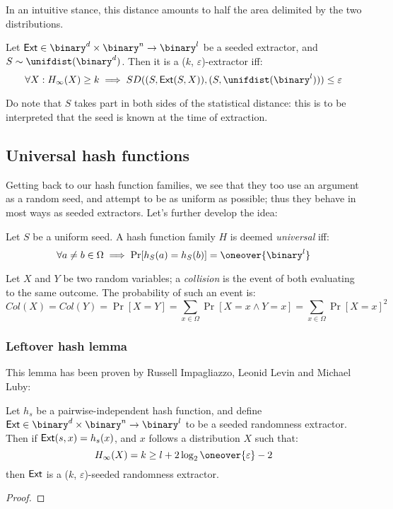 In an intuitive stance, this distance amounts to half the area delimited by the two distributions.


\begin{definition}
    Let $\ext \in \binary^d \times \binary^n \to \binary^l$ be a seeded extractor, and $S \sim \unifdist(\binary^d)$. Then it is a ($k$, $\varepsilon$)-extractor iff:
    \[
        \forall X : H_{\infty}(X) \geq k \implies SD((S, \ext(S, X)), (S, \unifdist(\binary^l))) \leq \varepsilon
    \]
\end{definition}

Do note that $S$ takes part in both sides of the statistical distance: this is to be interpreted that the seed is known at the time of extraction.

\subsection{Universal hash functions}

Getting back to our hash function families, we see that they too use an argument as a random seed, and attempt to be as uniform as possible; thus they behave in most ways as seeded extractors. Let's further develop the idea:

\begin{definition}
    Let $S$ be a uniform seed. A hash function family $H$ is deemed \emph{universal} iff:
    \[
        \forall a \neq b \in \Omega \implies \Pr[h_S(a) = h_S(b)] = \oneover{\binary^l}
    \]
\end{definition}

\begin{definition}
    Let $X$ and $Y$ be two \iid{} random variables; a \emph{collision} is the event of both evaluating to the same outcome. The probability of such an event is:
    \[
        Col(X) = Col(Y) = \Pr[X = Y] = \sum_{x \in \Omega}\Pr[X = x \wedge Y = x] = \sum_{x \in \Omega}\Pr[X = x]^2
    \]
\end{definition}

\subsubsection{Leftover hash lemma}

This lemma has been proven by Russell Impagliazzo, Leonid Levin and Michael Luby:

\begin{lemma}
    Let $h_s$ be a pairwise-independent hash function, and define $\ext \in \binary^d \times \binary^n \to \binary^l$ to be a seeded randomness extractor. Then if $\textup{\textsf{Ext}}(s, x) = h_s(x)$, and $x$ follows a distribution $X$ such that:
    \[
        H_\infty(X) = k \geq l + 2\log_2\oneover{\varepsilon} - 2
    \]
    then $\textup{\textsf{Ext}}$ is a ($k$, $\varepsilon$)-seeded randomness extractor.
\end{lemma}

\begin{proof}
    \todo{---}
\end{proof}
